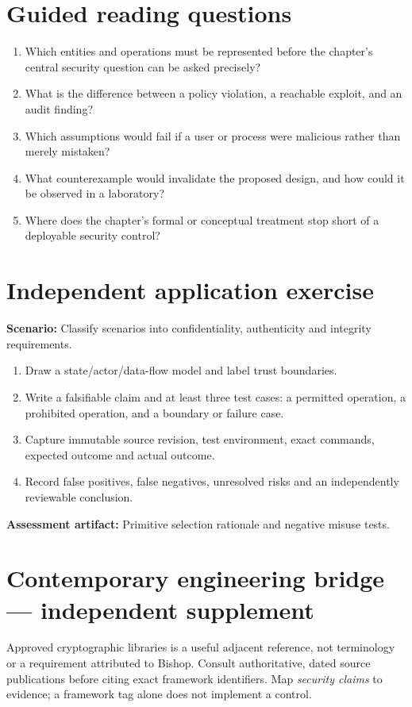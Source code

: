 \documentclass[10pt,letterpaper]{article}
\begin{document}
\section{Guided reading questions}
\begin{enumerate}
\item Which entities and operations must be represented before the chapter's central security question can be asked precisely?
\item What is the difference between a policy violation, a reachable exploit, and an audit finding?
\item Which assumptions would fail if a user or process were malicious rather than merely mistaken?
\item What counterexample would invalidate the proposed design, and how could it be observed in a laboratory?
\item Where does the chapter's formal or conceptual treatment stop short of a deployable security control?
\end{enumerate}
\section{Independent application exercise}
\textbf{Scenario:} Classify scenarios into confidentiality, authenticity and integrity requirements.
\begin{enumerate}
\item Draw a state/actor/data-flow model and label trust boundaries.
\item Write a falsifiable claim and at least three test cases: a permitted operation, a prohibited operation, and a boundary or failure case.
\item Capture immutable source revision, test environment, exact commands, expected outcome and actual outcome.
\item Record false positives, false negatives, unresolved risks and an independently reviewable conclusion.
\end{enumerate}
\textbf{Assessment artifact:} Primitive selection rationale and negative misuse tests.
\section{Contemporary engineering bridge --- independent supplement}
Approved cryptographic libraries is a useful adjacent reference, not terminology or a requirement attributed to Bishop. Consult authoritative, dated source publications before citing exact framework identifiers. Map \emph{security claims} to evidence; a framework tag alone does not implement a control.
\end{document}
